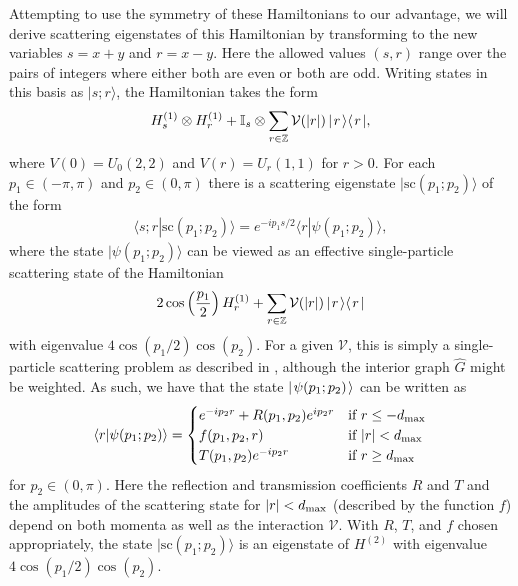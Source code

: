\documentclass[../thesis-main/thesis-main]{subfiles}
\begin{document}
Attempting to use the symmetry of these Hamiltonians to our advantage, we will derive scattering eigenstates of this Hamiltonian by transforming to the new variables $s = x+y$ and $r = x-y$.  Here the allowed values $(s,r)$ range over the pairs of integers where either both are even or both are odd.  Writing states in this basis as $|s;r\rangle$, the Hamiltonian  takes the form
\begin{equation}
  H^{(1)}_s\otimes H^{(1)}_r+ \mathbb{I}_s\otimes \sum_{r\in \mathbb{Z}} \mathcal{V}(|r|) \, |\mspace{2mu} r \mspace{2mu} \rangle\langle\mspace{2mu} r \mspace{2mu} |,
\label{eq:twopart_ham}
\end{equation}
where $V(0) = U_0(2,2)$ and $V(r) = U_r(1,1)$ for $r >0$.  For each $p_1\in (-\pi,\pi)$ and $p_2\in(0,\pi)$ there is a scattering eigenstate $|\mathrm{sc}(p_1;p_2)\rangle$ of the form
\begin{align}
\langle s;r |\mathrm{sc}(p_1;p_2)\rangle=e^{-ip_1 s/2} \langle r|\psi(p_1;p_2)\rangle,
\end{align}
where the state $|\psi(p_1;p_2)\rangle$ can be viewed as an effective single-particle scattering state of the Hamiltonian
\begin{equation}
 2\cos\left(\frac{p_1}{2}\right) H^{(1)}_r + \sum_{r\in \mathbb{Z}} \mathcal{V}(|r|) \, |\mspace{2mu} r \mspace{2mu} \rangle\langle\mspace{2mu} r \mspace{2mu} |\label{eq:vr_eqn}
\end{equation}
with eigenvalue $4 \cos( p_1/2) \cos(p_2)$.  For a given $\mathcal{V}$, this is simply a single-particle scattering problem as described in , although the interior graph $\widehat{G}$ might be weighted.  As such, we have that the state $|\mspace{2mu} \psi(p_1;p_2) \mspace{2mu} \rangle$ can be written as
\begin{equation}
\langle r|\psi (p_1;p_2)\rangle= \begin{cases}  e^{-i p_2 r} + R(p_1,p_2) e^{i p_2 r} &  \text{if } r \leq -d_{\text{max}}\\
  	f(p_1,p_2,r) &  \text{if } |r| < d_{\text{max}}\\
  	T(p_1,p_2) e^{- i p_2 r}  & \text{if } r \geq d_{\text{max}}\end{cases}
\label{eq:psip1p2}
\end{equation}
for $p_2\in (0,\pi)$. Here the reflection and transmission coefficients $R$ and $T$ and the amplitudes of the scattering state for $|r|<d_{\text{max}}$ (described by the function $f$) depend on both momenta as well as the interaction $\mathcal{V}$.  With $R$, $T$, and $f$ chosen appropriately, the state $|\mathrm{sc}(p_1;p_2)\rangle$ is an eigenstate of $H^{(2)}$ with eigenvalue $4\cos(p_1/2)\cos(p_2)$.
\end{document}
